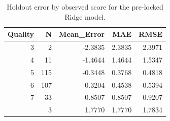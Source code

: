 \begin{table}

\caption{\label{tab:p5-error-by-quality}Holdout error by observed score for the pre-locked Ridge model.}
\centering
\begin{tabular}[t]{rrrrr}
\toprule
Quality & N & Mean\_Error & MAE & RMSE\\
\midrule
3 & 2 & -2.3835 & 2.3835 & 2.3971\\
4 & 11 & -1.4644 & 1.4644 & 1.5347\\
5 & 115 & -0.3448 & 0.3768 & 0.4818\\
6 & 107 & 0.3204 & 0.4538 & 0.5394\\
7 & 33 & 0.8507 & 0.8507 & 0.9207\\
\addlinespace
8 & 3 & 1.7770 & 1.7770 & 1.7834\\
\bottomrule
\end{tabular}
\end{table}
